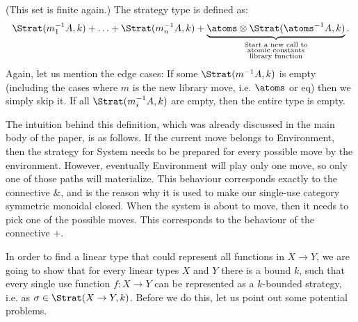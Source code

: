 \begin{definition}
\begin{itemize}
\begin{itemize}
               (This set is finite again.) The strategy type is defined as: 
               \begin{align*}
                \Strat(m_1^{-1}A, k) + \ldots + \Strat(m_n^{-1}A, k) + \underbrace{\atoms \otimes \Strat(\atoms^{-1}A, k)}_{\substack{\textrm{Start a new call to}\\
                \textrm{atomic constants}\\
                \textrm{library function}}}.
               \end{align*}
               Again, let us mention the edge cases: If some $\Strat(m^{-1}A, k)$ is empty (including the cases where $m$ is the new library move, i.e. $\atoms$ or $\text{eq}$)
               then we simply skip it. If all $\Strat(m_i^{-1}A, k)$ are empty, then the entire type is empty.
    \end{itemize}
\end{itemize}
\end{definition}
The intuition behind this definition, which was already discussed in the main body of the paper, is as follows. If the current move belongs to Environment, then the strategy 
for System needs to be prepared for every possible move by the environment. However, eventually Environment 
will play only one move, so only one of those paths will materialize. This behaviour corresponds exactly to the connective $\&$, and is the reason why  it is used to make our single-use category symmetric monoidal closed.
When the system is about to move, then it needs to pick one of the possible moves. This corresponds to the behaviour of the connective $+$.

In order to find a linear type that could represent all functions in $X \to Y$, we are going to show 
that for every linear types $X$ and $Y$ there is a bound $k$, such that every single use function $f : X \to Y$
can be represented as a $k$-bounded strategy, i.e. as $\sigma \in \Strat(X \to Y, k)$. Before we do this, 
let us point out some potential problems. 

